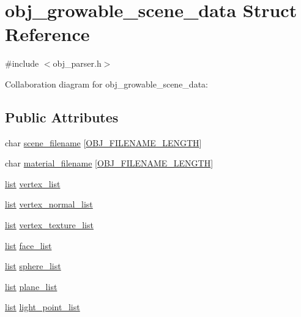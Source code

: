 \hypertarget{structobj__growable__scene__data}{\section{obj\+\_\+growable\+\_\+scene\+\_\+data Struct Reference}
\label{structobj__growable__scene__data}
}


{\ttfamily \#include $<$obj\+\_\+parser.\+h$>$}



Collaboration diagram for obj\+\_\+growable\+\_\+scene\+\_\+data\+:
\subsection*{Public Attributes}
\begin{DoxyCompactItemize}
\item 
char \hyperlink{structobj__growable__scene__data_ab11f689f063e184661781e94da0ccce1}{scene\+\_\+filename} \mbox{[}\hyperlink{obj__parser_8h_a75e6857d3610a75bc56591ab64210fc0}{O\+B\+J\+\_\+\+F\+I\+L\+E\+N\+A\+M\+E\+\_\+\+L\+E\+N\+G\+T\+H}\mbox{]}
\item 
char \hyperlink{structobj__growable__scene__data_a2b760bb727ab7b49bb9971fb3e6ed3a8}{material\+\_\+filename} \mbox{[}\hyperlink{obj__parser_8h_a75e6857d3610a75bc56591ab64210fc0}{O\+B\+J\+\_\+\+F\+I\+L\+E\+N\+A\+M\+E\+\_\+\+L\+E\+N\+G\+T\+H}\mbox{]}
\item 
\hyperlink{structlist}{list} \hyperlink{structobj__growable__scene__data_a13975a6dbaa62718add1043de08324d8}{vertex\+\_\+list}
\item 
\hyperlink{structlist}{list} \hyperlink{structobj__growable__scene__data_a8434f1f1123eaf06a4e87f7a4c157527}{vertex\+\_\+normal\+\_\+list}
\item 
\hyperlink{structlist}{list} \hyperlink{structobj__growable__scene__data_a85ee455560d2f8c8910257bb4b96c5bf}{vertex\+\_\+texture\+\_\+list}
\item 
\hyperlink{structlist}{list} \hyperlink{structobj__growable__scene__data_a371039f614baf3b51c079d577ed8247a}{face\+\_\+list}
\item 
\hyperlink{structlist}{list} \hyperlink{structobj__growable__scene__data_a5c49ed985e0f8bddf535807b840618f3}{sphere\+\_\+list}
\item 
\hyperlink{structlist}{list} \hyperlink{structobj__growable__scene__data_aea6999082b6a4000f5753ab81e30806b}{plane\+\_\+list}
\item 
\hyperlink{structlist}{list} \hyperlink{structobj__growable__scene__data_a78cb39927508e8622f328756a954c50d}{light\+\_\+point\+\_\+list}

\end{DoxyCompactItemize}
